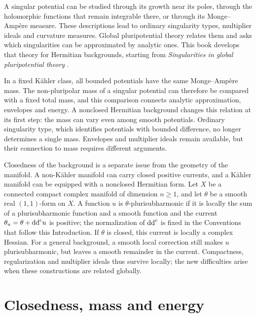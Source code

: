 
A singular potential can be studied through its growth near its poles, through the holomorphic functions that remain integrable there, or through its Monge--Amp\`ere measure. These descriptions lead to ordinary singularity types, multiplier ideals and curvature measures. Global pluripotential theory relates them and asks which singularities can be approximated by analytic ones. This book develops that theory for Hermitian backgrounds, starting from \emph{Singularities in global pluripotential theory} \cite{SGPT}.

In a fixed K\"ahler class, all bounded potentials have the same Monge--Amp\`ere mass. The non-pluripolar mass of a singular potential can therefore be compared with a fixed total mass, and this comparison connects analytic approximation, envelopes and energy. A nonclosed Hermitian background changes this relation at its first step: the mass can vary even among smooth potentials. Ordinary singularity type, which identifies potentials with bounded difference, no longer determines a single mass. Envelopes and multiplier ideals remain available, but their connection to mass requires different arguments.

Closedness of the background is a separate issue from the geometry of the manifold. A non-K\"ahler manifold can carry closed positive currents, and a K\"ahler manifold can be equipped with a nonclosed Hermitian form. Let $X$ be a connected compact complex manifold of dimension $n\geq1$, and let $\theta$ be a smooth real $(1,1)$-form on $X$. A function $u$ is $\theta$-plurisubharmonic if it is locally the sum of a plurisubharmonic function and a smooth function and the current $\theta_u=\theta+\mathrm{dd}^{\mathrm{c}} u$ is positive; the normalization of $\mathrm{dd}^{\mathrm{c}}$ is fixed in the Conventions that follow this Introduction. If $\theta$ is closed, this current is locally a complex Hessian. For a general background, a smooth local correction still makes $u$ plurisubharmonic, but leaves a smooth remainder in the current. Compactness, regularization and multiplier ideals thus survive locally; the new difficulties arise when these constructions are related globally.

\section*{Closedness, mass and energy}

